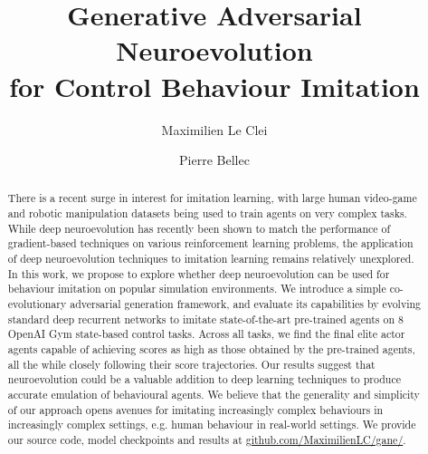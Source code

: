 \documentclass[dvipsnames,format=sigconf,anonymous=false,review=false]{acmart}
\begin{document}
\title[Generative Adversarial Neuroevolution for Control Behaviour Imitation]{Generative Adversarial Neuroevolution \\for Control Behaviour Imitation}
\author{Maximilien Le Clei}

\author{Pierre Bellec}
\renewcommand{\shortauthors}{Le Clei and Bellec}

\begin{abstract}
There is a recent surge in interest for imitation learning, with large human video-game and robotic manipulation datasets being used to train agents on very complex tasks. While deep neuroevolution has recently been shown to match the performance of gradient-based techniques on various reinforcement learning problems, the application of deep neuroevolution techniques to imitation learning remains relatively unexplored. In this work, we propose to explore whether deep neuroevolution can be used for behaviour imitation on popular simulation environments. We introduce a simple co-evolutionary adversarial generation framework, and evaluate its capabilities by evolving standard deep recurrent networks to imitate state-of-the-art pre-trained agents on 8 OpenAI Gym state-based control tasks. Across all tasks, we find the final elite actor agents capable of achieving scores as high as those obtained by the pre-trained agents, all the while closely following their score trajectories. Our results suggest that neuroevolution could be a valuable addition to deep learning techniques to produce accurate emulation of behavioural agents. We believe that the generality and simplicity of our approach opens avenues for imitating increasingly complex behaviours in increasingly complex settings, e.g. human behaviour in real-world settings. We provide our source code, model checkpoints and results at \textcolor{blue}{\href{https://github.com/MaximilienLC/gane/}{github.com/MaximilienLC/gane/}}.
\end{abstract}
\end{document}

